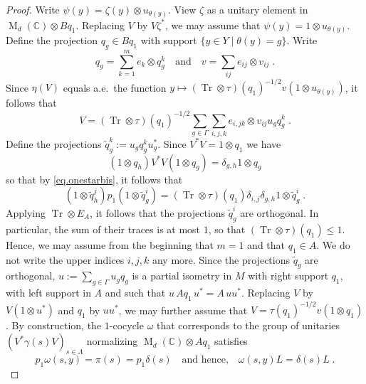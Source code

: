 \documentclass[a4paper,11pt]{amsart}
\numberwithin{equation}{section}
\begin{document}
\begin{proof}
Write $\psi(y) = \zeta(y) {\otimes} u_{\theta(y)}$. View $\zeta$ as a unitary element in ${\operatorname{M}}_d({\mathbb{C}}) {\otimes} B q_1$. Replacing $V$ by $V \zeta^*$, we may assume that $\psi(y) = 1 {\otimes} u_{\theta(y)}$. Define the projection $q_g \in B q_1$ with support $\{y \in Y \mid \theta(y) = g\}$. Write
$$q_g = \sum_{k=1}^m e_k {\otimes} q^k_g \quad\text{and}\quad v = \sum_{ij} e_{ij} {\otimes} v_{ij} \; .$$
Since $\eta(V)$ equals a.e.\ the function $y \mapsto ({\operatorname{Tr}} {\otimes} \tau)(q_1)^{-1/2} v(1 {\otimes} u_{\theta(y)})$, it follows that
\begin{equation}\label{eq.onestarbis}
V = ({\operatorname{Tr}} {\otimes} \tau)(q_1)^{-1/2} \sum_{g \in \Gamma} \sum_{i,j,k} e_{i,jk} {\otimes} v_{ij} u_g q^k_g \; .
\end{equation}
Define the projections ${\tilde{q}}^k_g := u_g q^k_g u_g^*$. Since $V^* V = 1 {\otimes} q_1$ we have $$(1 {\otimes} q_h) V^* V (1 {\otimes} q_g) = \delta_{g,h} 1 {\otimes} q_g$$
so that by \eqref{eq.onestarbis}, it follows that
$$
(1 {\otimes} {\tilde{q}}^j_h) p_1 (1 {\otimes} {\tilde{q}}^i_g) = ({\operatorname{Tr}} {\otimes} \tau)(q_1) \delta_{i,j} \delta_{g,h} 1 {\otimes} {\tilde{q}}^i_g \; .
$$
Applying ${\operatorname{Tr}} {\otimes} E_A$, it follows that the projections ${\tilde{q}}^i_g$ are orthogonal. In particular, the sum of their traces is at most $1$, so that $({\operatorname{Tr}} {\otimes} \tau)(q_1) {\leqslant} 1$. Hence, we may assume from the beginning that $m=1$ and that $q_1 \in A$. We do not write the upper indices $i,j,k$ any more. Since the projections ${\tilde{q}}_g$ are orthogonal, $u := \sum_{g \in \Gamma} u_g q_g$ is a partial isometry in $M$ with right support $q_1$, with left support in $A$ and such that $u \, A q_1 \, u^* = A \, uu^*$. Replacing $V$ by $V(1 {\otimes} u^*)$ and $q_1$ by $uu^*$, we may further assume that $V = \tau(q_1)^{-1/2} v (1 {\otimes} q_1)$. By construction, the $1$-cocycle ${\omega}$ that corresponds to the group of unitaries $(V^* \gamma(s) V)_{s \in \Lambda}$ normalizing ${\operatorname{M}}_d({\mathbb{C}}) {\otimes} A q_1$ satisfies
\begin{equation}\label{eq.deltaomega}
p_1 {\omega}(s,y) = \pi(s) = p_1 \delta(s) \quad\text{and hence,}\quad {\omega}(s,y) L = \delta(s) L \; .
\end{equation}


\end{proof}
\end{document}
